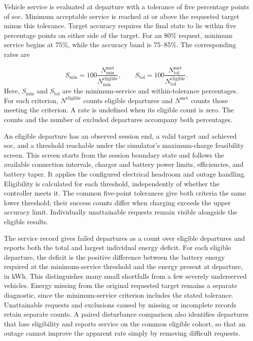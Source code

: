 Vehicle service is evaluated at departure with a tolerance of five percentage points of \gls{soc}. Minimum acceptable service is reached at or above the requested target minus this tolerance. Target accuracy requires the final state to lie within five percentage points on either side of the target. For an 80\% request, minimum service begins at 75\%, while the accuracy band is 75--85\%. The corresponding rates are
\begin{samepage}
\begin{equation}
S_{\min}=100\frac{N_{\min}^{\mathrm{met}}}{N_{\min}^{\mathrm{eligible}}},\qquad
S_{\mathrm{tol}}=100\frac{N_{\mathrm{tol}}^{\mathrm{met}}}{N_{\mathrm{tol}}^{\mathrm{eligible}}}.
\label{eq:sim-service-rates}
\end{equation}
Here, $S_{\min}$ and $S_{\mathrm{tol}}$ are the minimum-service and within-tolerance percentages. For each criterion, $N^{\mathrm{eligible}}$ counts eligible departures and $N^{\mathrm{met}}$ counts those meeting the criterion. A rate is undefined when its eligible count is zero. The counts and the number of excluded departures accompany both percentages.\par
\end{samepage}

An eligible departure has an observed session end, a valid target and achieved \gls{soc}, and a threshold reachable under the simulator's maximum-charge feasibility screen. This screen starts from the session boundary state and follows the available connection intervals, charger and battery power limits, efficiencies, and battery taper. It applies the configured electrical headroom and outage handling. Eligibility is calculated for each threshold, independently of whether the controller meets it. The common five-point tolerances give both criteria the same lower threshold; their success counts differ when charging exceeds the upper accuracy limit. Individually unattainable requests remain visible alongside the eligible results.

The service record gives failed departures as a count over eligible departures and reports both the total and largest individual energy deficit. For each eligible departure, the deficit is the positive difference between the battery energy required at the minimum-service threshold and the energy present at departure, in kWh. This distinguishes many small shortfalls from a few severely underserved vehicles. Energy missing from the original requested target remains a separate diagnostic, since the minimum-service criterion includes the stated tolerance. Unattainable requests and exclusions caused by missing or incomplete records retain separate counts. A paired disturbance comparison also identifies departures that lose eligibility and reports service on the common eligible cohort, so that an outage cannot improve the apparent rate simply by removing difficult requests.

